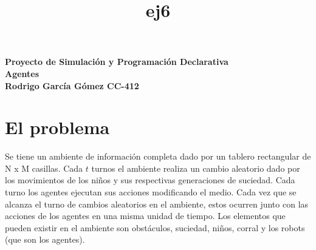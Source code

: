 \documentclass[a4paper,12pt]{article}
\begin{document}
 

\title{ej6}

\begin{titlepage}
\centering
\vspace*{\fill}
\vspace*{0.5cm}
\huge\bfseries
Proyecto de Simulación y Programación
Declarativa\\
Agentes\\
\vspace*{0.5cm}
\large Rodrigo García Gómez CC-412
\vspace*{\fill}
\end{titlepage}

\section*{El problema}
Se tiene un ambiente de información completa dado por un tablero rectangular de N x M casillas. Cada $t$ turnos el ambiente realiza un cambio aleatorio dado por los movimientos de los niños y sus respectivas generaciones de suciedad. Cada turno los agentes ejecutan sus acciones modificando el medio. Cada vez que se alcanza el turno de cambios aleatorios en el ambiente, estos ocurren junto con las acciones de los agentes en una misma unidad de tiempo. Los elementos que pueden existir en el ambiente son obstáculos, suciedad, niños, corral y los robots (que son los agentes).
\end{document}
